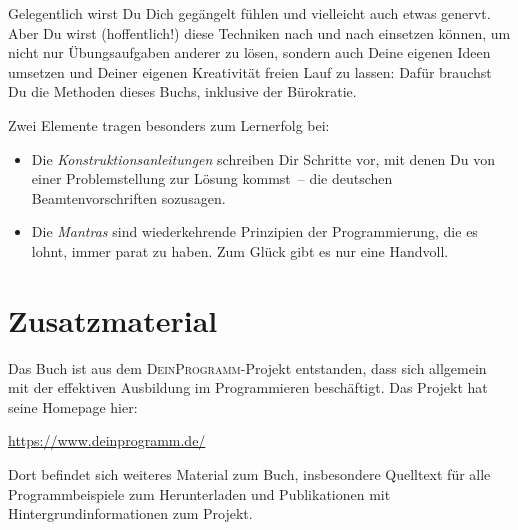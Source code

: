 Gelegentlich wirst Du Dich gegängelt fühlen und vielleicht auch etwas
genervt.  Aber Du wirst (hoffentlich!) diese Techniken nach und nach
einsetzen können, um nicht nur Übungsaufgaben anderer zu lösen, sondern
auch Deine eigenen Ideen umsetzen und Deiner eigenen Kreativität freien Lauf zu
lassen: Dafür brauchst Du die Methoden dieses Buchs, inklusive der
Bürokratie.

Zwei Elemente tragen besonders zum Lernerfolg bei:
%
\begin{itemize}
\item Die \textit{Konstruktionsanleitungen} schreiben Dir Schritte
  vor, mit denen Du von einer Problemstellung zur Lösung kommst~-- die
  deutschen Beamtenvorschriften sozusagen.
\item Die \textit{Mantras} sind wiederkehrende Prinzipien der
  Programmierung, die es lohnt, immer parat zu haben.  Zum Glück gibt
  es nur eine Handvoll.
\end{itemize}
%

\section{Zusatzmaterial}

Das Buch ist aus dem \textsc{DeinProgramm}-Projekt entstanden, dass
sich allgemein mit der effektiven Ausbildung im Programmieren
beschäftigt.  Das Projekt hat seine Homepage hier:
%
\begin{center}
  \url{https://www.deinprogramm.de/}
\end{center}
%
Dort befindet sich weiteres Material zum Buch, insbesondere Quelltext
für alle Programmbeispiele zum Herunterladen und Publikationen mit
Hintergrundinformationen zum Projekt.



